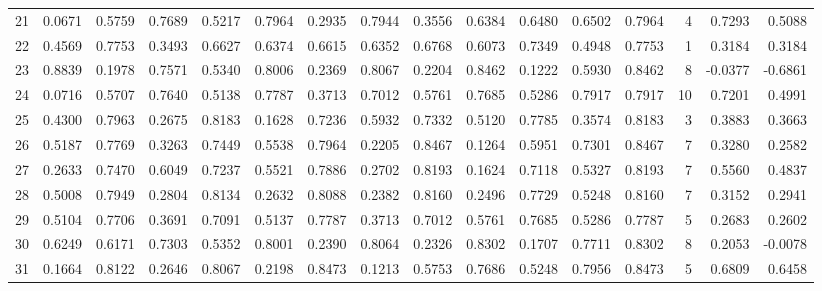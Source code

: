 \begin{tabular}{lrrrrrrrrrrrrrrr}
21  &      0.0671 &  0.5759 &  0.7689 &  0.5217 &  0.7964 &  0.2935 &  0.7944 &  0.3556 &  0.6384 &  0.6480 &   0.6502 &     0.7964 &      4 &                    0.7293 &                     0.5088 \\
22  &      0.4569 &  0.7753 &  0.3493 &  0.6627 &  0.6374 &  0.6615 &  0.6352 &  0.6768 &  0.6073 &  0.7349 &   0.4948 &     0.7753 &      1 &                    0.3184 &                     0.3184 \\
23  &      0.8839 &  0.1978 &  0.7571 &  0.5340 &  0.8006 &  0.2369 &  0.8067 &  0.2204 &  0.8462 &  0.1222 &   0.5930 &     0.8462 &      8 &                   -0.0377 &                    -0.6861 \\
24  &      0.0716 &  0.5707 &  0.7640 &  0.5138 &  0.7787 &  0.3713 &  0.7012 &  0.5761 &  0.7685 &  0.5286 &   0.7917 &     0.7917 &     10 &                    0.7201 &                     0.4991 \\
25  &      0.4300 &  0.7963 &  0.2675 &  0.8183 &  0.1628 &  0.7236 &  0.5932 &  0.7332 &  0.5120 &  0.7785 &   0.3574 &     0.8183 &      3 &                    0.3883 &                     0.3663 \\
26  &      0.5187 &  0.7769 &  0.3263 &  0.7449 &  0.5538 &  0.7964 &  0.2205 &  0.8467 &  0.1264 &  0.5951 &   0.7301 &     0.8467 &      7 &                    0.3280 &                     0.2582 \\
27  &      0.2633 &  0.7470 &  0.6049 &  0.7237 &  0.5521 &  0.7886 &  0.2702 &  0.8193 &  0.1624 &  0.7118 &   0.5327 &     0.8193 &      7 &                    0.5560 &                     0.4837 \\
28  &      0.5008 &  0.7949 &  0.2804 &  0.8134 &  0.2632 &  0.8088 &  0.2382 &  0.8160 &  0.2496 &  0.7729 &   0.5248 &     0.8160 &      7 &                    0.3152 &                     0.2941 \\
29  &      0.5104 &  0.7706 &  0.3691 &  0.7091 &  0.5137 &  0.7787 &  0.3713 &  0.7012 &  0.5761 &  0.7685 &   0.5286 &     0.7787 &      5 &                    0.2683 &                     0.2602 \\
30  &      0.6249 &  0.6171 &  0.7303 &  0.5352 &  0.8001 &  0.2390 &  0.8064 &  0.2326 &  0.8302 &  0.1707 &   0.7711 &     0.8302 &      8 &                    0.2053 &                    -0.0078 \\
31  &      0.1664 &  0.8122 &  0.2646 &  0.8067 &  0.2198 &  0.8473 &  0.1213 &  0.5753 &  0.7686 &  0.5248 &   0.7956 &     0.8473 &      5 &                    0.6809 &                     0.6458 \\

\end{tabular}
